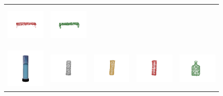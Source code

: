 \documentclass[bachelor, nocolorlinks, printoneside]{seuthesis} %
\begin{document}
\begin{Main}
\begin{figure}[!h]
\begin{tabular}{c@{}c@{}c@{}c@{}c@{}}
    	\includegraphics[width=0.22\columnwidth,height=2cm]{figs/real_dataset/AE/bench_17ebf60b6ba61ae949e6f7df978f3373_fine.png} &
    	\includegraphics[width=0.22\columnwidth,height=2cm]{figs/real_dataset/oracle/bench_17ebf60b6ba61ae949e6f7df978f3373_oracle.png} \\
    	\vspace{-5mm}
    	\includegraphics[width=0.11\columnwidth,height=2cm]{figs/real_dataset/Image/bottle_ab3795042c759b6798646029ad91cbbd.png} &
    	\includegraphics[width=0.22\columnwidth,height=2cm]{figs/real_dataset/GT/bottle_ab3795042c759b6798646029ad91cbbd_gt.png} &
    	\includegraphics[width=0.22\columnwidth,height=2cm]{figs/real_dataset/AE_label/bottle_ab3795042c759b6798646029ad91cbbd_fine.png} &
    	\includegraphics[width=0.22\columnwidth,height=2cm]{figs/real_dataset/AE/bottle_ab3795042c759b6798646029ad91cbbd_fine.png} &
    	\includegraphics[width=0.22\columnwidth,height=2cm]{figs/real_dataset/oracle/bottle_3b956918a41da89c325e6e8eb2c67fd8_oracle.png} \\

\end{tabular}
\end{figure}
\end{Main}
\end{document}
